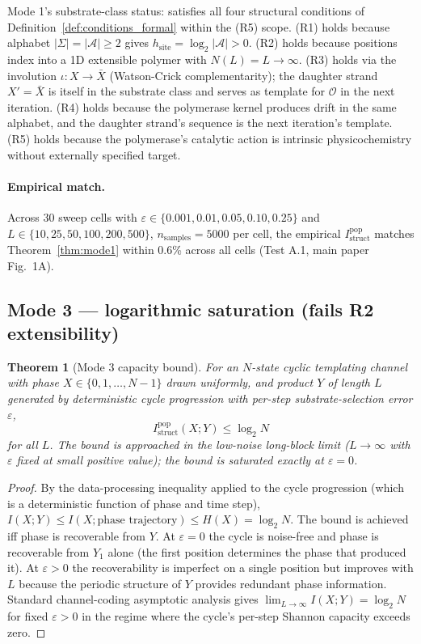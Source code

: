 \documentclass[11pt]{article}
\theoremstyle{plain}
\newtheorem{theorem}{Theorem}
\theoremstyle{definition}
\newcommand{\Istructpop}{I_{\mathrm{struct}}^{\mathrm{pop}}}
\newcommand{\Op}{\mathcal{O}}
\begin{document}
Mode 1's substrate-class status: satisfies all four structural conditions of Definition~\ref{def:conditions_formal} within the (R5) scope. (R1) holds because alphabet $|\Sigma| = |\mathcal{A}| \ge 2$ gives $h_{\mathrm{site}} = \log_2 |\mathcal{A}| > 0$. (R2) holds because positions index into a 1D extensible polymer with $N(L) = L \to \infty$. (R3) holds via the involution $\iota: X \to \bar{X}$ (Watson-Crick complementarity); the daughter strand $X' = \bar{X}$ is itself in the substrate class and serves as template for $\Op$ in the next iteration. (R4) holds because the polymerase kernel produces drift in the same alphabet, and the daughter strand's sequence is the next iteration's template. (R5) holds because the polymerase's catalytic action is intrinsic physicochemistry without externally specified target.

\paragraph{Empirical match.} Across 30 sweep cells with $\varepsilon \in \{0.001, 0.01, 0.05, 0.10, 0.25\}$ and $L \in \{10, 25, 50, 100, 200, 500\}$, $n_{\mathrm{samples}} = 5000$ per cell, the empirical $\Istructpop$ matches Theorem~\ref{thm:mode1} within 0.6\% across all cells (Test A.1, main paper Fig.~1A).

\subsection{Mode 3 --- logarithmic saturation (fails R2 extensibility)}

\begin{theorem}[Mode 3 capacity bound]
\label{thm:mode3}
For an $N$-state cyclic templating channel with phase $X \in \{0, 1, \ldots, N-1\}$ drawn uniformly, and product $Y$ of length $L$ generated by deterministic cycle progression with per-step substrate-selection error $\varepsilon$,
\[
\Istructpop(X; Y) \le \log_2 N
\]
for all $L$. The bound is approached in the low-noise long-block limit ($L \to \infty$ with $\varepsilon$ fixed at small positive value); the bound is saturated exactly at $\varepsilon = 0$.
\end{theorem}

\begin{proof}
By the data-processing inequality applied to the cycle progression (which is a deterministic function of phase and time step), $I(X; Y) \le I(X; \text{phase trajectory}) \le H(X) = \log_2 N$. The bound is achieved iff phase is recoverable from $Y$. At $\varepsilon = 0$ the cycle is noise-free and phase is recoverable from $Y_1$ alone (the first position determines the phase that produced it). At $\varepsilon > 0$ the recoverability is imperfect on a single position but improves with $L$ because the periodic structure of $Y$ provides redundant phase information. Standard channel-coding asymptotic analysis \citep[Theorem 8.7.1]{CoverThomas2006} gives $\lim_{L \to \infty} I(X; Y) = \log_2 N$ for fixed $\varepsilon > 0$ in the regime where the cycle's per-step Shannon capacity exceeds zero.
\end{proof}
\end{document}
